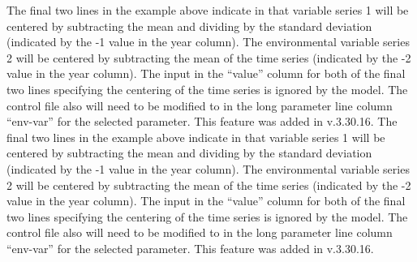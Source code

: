 The final two lines in the example above indicate in that variable series 1 will be centered by subtracting the mean and dividing by the standard deviation (indicated by the -1 value in the year column). The environmental variable series 2 will be centered by subtracting the mean of the time series (indicated by the -2 value in the year column). The input in the ``value'' column for both of the final two lines specifying the centering of the time series is ignored by the model. The control file also will need to be modified to in the long parameter line column ``env-var'' for the selected parameter. This feature was added in v.3.30.16.
The final two lines in the example above indicate in that variable series 1 will be centered by subtracting the mean and dividing by the standard deviation (indicated by the -1 value in the year column). The environmental variable series 2 will be centered by subtracting the mean of the time series (indicated by the -2 value in the year column). The input in the ``value'' column for both of the final two lines specifying the centering of the time series is ignored by the model. The control file also will need to be modified to in the long parameter line column ``env-var'' for the selected parameter. This feature was added in v.3.30.16.


